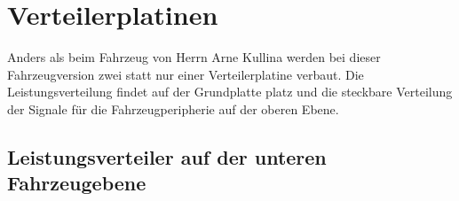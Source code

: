 

\pagestyle{fancy}
\rhead{\thepage} \chead{} 
\cfoot{}

\section{Verteilerplatinen}\label{Sec8}

Anders als beim Fahrzeug von Herrn Arne Kullina werden bei dieser Fahrzeugversion zwei statt nur einer Verteilerplatine verbaut. Die Leistungsverteilung findet auf der Grundplatte platz und die steckbare Verteilung der Signale für die Fahrzeugperipherie auf der oberen Ebene. 

\subsection{Leistungsverteiler auf der unteren Fahrzeugebene}\label{Sec8Sub1}

